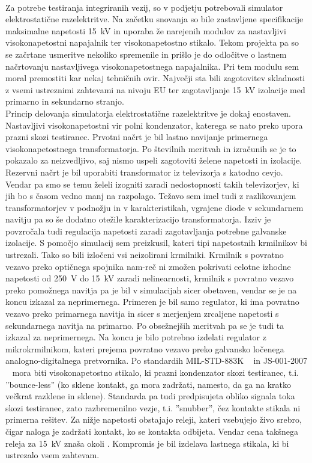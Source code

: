 \documentclass[a4paper,twoside,openright,12pt,Slovene]{book}
\begin{document}
~\\Za potrebe testiranja integriranih vezij, so v podjetju potrebovali simulator elektrostatične razelektritve. Na začetku snovanja so bile zastavljene specifikacije maksimalne napetosti \SI{15}{\kilo\volt} in uporaba že narejenih modulov za nastavljivi visokonapetostni napajalnik ter visokonapetostno stikalo. Tekom projekta pa so se začrtane usmeritve nekoliko spremenile in prišlo je do odločitve o lastnem načrtovanju nastavljivega visokonapetostnega napajalnika. Pri tem modulu sem moral premostiti kar nekaj tehničnih ovir. Največji sta bili zagotovitev skladnosti z vsemi ustreznimi zahtevami na nivoju EU ter zagotavljanje \SI{15}{\kilo\volt} izolacije med primarno in sekundarno stranjo.   
~\\Princip delovanja simulatorja elektrostatične razelektritve je dokaj enostaven. Nastavljivi visokonapetostni vir polni kondenzator, katerega se nato preko upora prazni skozi testiranec.    
Prvotni načrt je bil lastno navijanje primernega visokonapetostnega transformatorja. Po številnih meritvah in izračunih se je to pokazalo za neizvedljivo, saj nismo uspeli zagotoviti želene napetosti in izolacije. Rezervni načrt je bil uporabiti transformator iz televizorja s katodno cevjo. Vendar pa smo se temu želeli izogniti zaradi nedostopnosti takih televizorjev, ki jih bo s časom vedno manj na razpolago. Težavo sem imel tudi z razlikovanjem transformatorjev v podnožju in v karakteristikah, vgrajene diode v sekundarnem navitju pa so še dodatno otežile karakterizacijo transformatorja. 
Izziv je povzročala tudi regulacija napetosti zaradi zagotavljanja potrebne galvanske izolacije. S pomočjo simulacij sem preizkusil, kateri tipi napetostnih krmilnikov bi ustrezali. Tako so bili izločeni vsi neizolirani krmilniki. Krmilnik s povratno vezavo preko optičnega spojnika nam-reč ni zmožen pokrivati celotne izhodne napetosti od \SI{250}{\volt} do \SI{15}{\kilo\volt} zaradi nelinearnosti, krmilnik s povratno vezavo preko pomožnega navitja pa je bil v simulacijah sicer obetaven, vendar se je na koncu izkazal za neprimernega. Primeren je bil samo regulator, ki ima povratno vezavo preko primarnega navitja in sicer s merjenjem zrcaljene napetosti s sekundarnega navitja na primarno. Po obsežnejših meritvah pa se je tudi ta izkazal za neprimernega. Na koncu je bilo potrebno izdelati regulator z mikrokrmilnikom, kateri prejema povratno vezavo preko galvansko ločenega analogno-digitalnega pretvornika.
Po standardih MIL-STD-883K ~\cite{MIL-STD-883K} in JS-001-2007 ~\cite{JS-001-2017} mora biti visokonapetostno stikalo, ki prazni kondenzator skozi testiranec, t.i. ''bounce-less'' (ko sklene kontakt, ga mora zadržati, namesto, da ga na kratko večkrat razklene in sklene). Standarda pa tudi predpisujeta obliko signala toka skozi testiranec, zato razbremenilno vezje, t.i. ''snubber'', čez kontakte stikala ni primerna rešitev. Za nižje napetosti obstajajo releji, kateri vsebujejo živo srebro, čigar naloga je zadržati kontakt, ko se kontakta odbijeta. Vendar cena takšnega releja za \SI{15}{\kilo\volt} znaša okoli .
Kompromis je bil izdelava lastnega stikala, ki bi ustrezalo vsem zahtevam.
\end{document}
